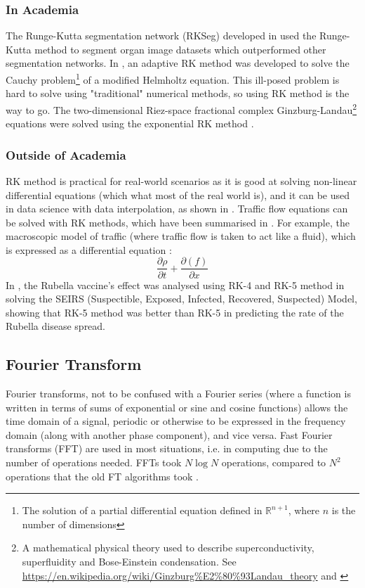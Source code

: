 \documentclass[a4paper, 10pt, conference]{ieeeconf}      %
\begin{document}
\subsubsection{In Academia} %
The Runge-Kutta segmentation network (RKSeg) developed in \cite{Zhu2023} used the Runge-Kutta method to segment organ image datasets which outperformed other segmentation networks. In \cite{Jday2023}, an adaptive RK method was developed to solve the Cauchy problem\footnote{The solution of a partial differential equation defined in $\mathbb{R}^{n+1}$, where $n$ is the number of dimensions} of a modified Helmholtz equation. This ill-posed problem is hard to solve using "traditional" numerical methods, so using RK method is the way to go. The two-dimensional Riez-space fractional complex Ginzburg-Landau\footnote{A mathematical physical theory used to describe superconductivity, superfluidity and Bose-Einstein condensation. See \url{https://en.wikipedia.org/wiki/Ginzburg\%E2\%80\%93Landau_theory} and \cite{Aranson2002}} equations \cite{Wang2018} were solved using the exponential RK method \cite{Hochbruck2005}\cite{Hochbruck2010}.
\\
\subsubsection{Outside of Academia} %
RK method is practical for real-world scenarios as it is good at solving non-linear differential equations (which what most of the real world is), and it can be used in data science with data interpolation, as shown in \cite{Karim2018}. Traffic flow equations can be solved with RK methods, which have been summarised in \cite{Naja2022}. For example, the macroscopic model of traffic (where traffic flow is taken to act like a fluid), which is expressed as a differential equation \cite{Lighthill1955}\cite{Nagatani2002}: 
\begin{equation}
    \frac{\partial{\rho}}{\partial{t}} + \frac{\partial(f)}{\partial{x}}
\end{equation}
In \cite{Asri2021}, the Rubella vaccine's effect was analysed using RK-4 and RK-5 method in solving the SEIRS (Suspectible, Exposed, Infected, Recovered, Suspected) Model, showing that RK-5 method was better than RK-5 in predicting the rate of the Rubella disease spread. 
\\
\subsection{Fourier Transform} %
Fourier transforms, not to be confused with a Fourier series (where a function is written in terms of sums of exponential or sine and cosine functions) allows the time domain of a signal, periodic or otherwise to be expressed in the frequency domain (along with another phase component), and vice versa. Fast Fourier transforms (FFT) are used in most situations, i.e. in computing due to the number of operations needed. FFTs took $N\log{N}$ operations, compared to $N^2$ operations that the old FT algorithms took \cite{Cooley1969}.
\\
\end{document}
